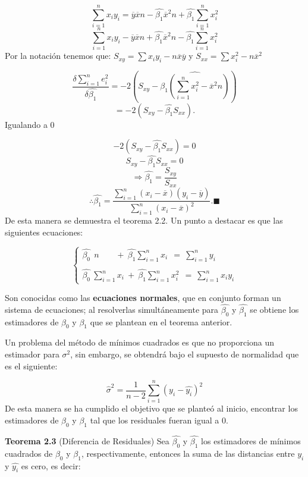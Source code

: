 \documentclass[
  a4paper,
  oneside,
  openany]{book}
\begin{document}
\[\sum_{i=1}^{n}x_{i}y_{i}=\overline{y}\overline{x}n-\hat{\beta_{1}}\overline{x}^2n+\hat{\beta_{1}}\sum_{i=1}^{n}x_{i}^2\]
\[\sum_{i=1}^{n}x_{i}y_{i}-\overline{y}\overline{x}n+\hat{\beta_{1}}\overline{x}^2n-\hat{\beta_{1}}\sum_{i=1}^{n}x_{i}^2\]
Por la notación tenemos que: \(S_{xy}=\sum x_{i}y_{i} - n \overline{x}\overline{y}\) y \(S_{xx}= \sum x_{i}^2 - n\overline{x}^2\)

\[\frac{\delta \sum_{i=1}^{n}e_{i}^2}{\delta\hat{\beta_{1}}}=-2\left(S_{xy}-\hat{\beta_{1}\left(\sum_{i=1}^{n}x_{i}^2-\overline{x}^2n\right)}\right)\]
\[=-2(S_{xy}-\hat{\beta_{1}}S_{xx}).\]
Igualando a 0

\[-2(S_{xy}-\hat{\beta_{1}}S_{xx})=0\]
\[S_{xy}-\hat{\beta_{1}}S_{xx}=0\]
\[\Rightarrow \hat{\beta_{1}}=\frac{S_{xy}}{S_{xx}}\]
\[\therefore \hat{\beta_{1}}=\frac{\sum_{i=1}^{n}(x_{i}-\overline{x})(y_{i}-\overline{y})}{\sum_{i=1}^{n}(x_{i}-\overline{x})^2}.\blacksquare\]
De esta manera se demuestra el teorema 2.2. Un punto a destacar es que las siguientes ecuaciones:

\[
\left\{
\begin{array}{ll} \hat{\beta_{0}} \ \ n  \ \ \  \ \ \ \ \ \ + \ \hat{\beta_{1}}\sum_{i=1}^{n}x_{i}\  \ = \ \sum_{i=1}^{n}y_{i} \\
\\
\hat{\beta_{0}} \ \sum_{i=1}^{n}x_{i} \ + \ \hat{\beta_{1}}\sum_{i=1}^{n}x_{i}^2 \ \ = \ \sum_{i=1}^{n}x_{i}y_{i}
\end{array}
\right. 
\]

Son conocidas como las \textbf{ecuaciones normales}, que en conjunto forman un sistema de ecuaciones; al resolverlas simultáneamente para \(\hat{\beta_{0}}\) y \(\hat{\beta_{1}}\) se obtiene los estimadores de \(\beta_{0}\) y \(\beta_{1}\) que se plantean en el teorema anterior.

Un problema del método de mínimos cuadrados es que no proporciona un estimador para \(\sigma^2\), sin embargo, se obtendrá bajo el supuesto de normalidad que es el siguiente:

\[\hat{\sigma}^2=\frac{1}{n-2}\sum_{i=1}^{n}(y_{i}-\hat{y_{i}})^2\]
De esta manera se ha cumplido el objetivo que se planteó al inicio, encontrar los estimadores de \(\beta_{0}\) y \(\beta_{1}\) tal que los residuales fueran igual a 0.

\textbf{Teorema 2.3} (Diferencia de Residuales) Sea \(\hat{\beta_{0}}\) y \(\hat{\beta_{1}}\) los estimadores de mínimos cuadrados de \(\beta_{0}\) y \(\beta_{1}\), respectivamente, entonces la suma de las distancias entre \(y_{i}\) y \(\hat{y_{i}}\) es cero, es decir:
\end{document}

